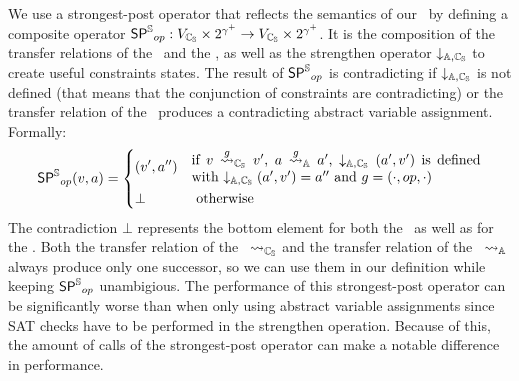 We use a strongest-post operator that reflects the semantics of our \symbolicExecutionCPA\ by 
defining a composite operator $\operatorname{\operatorname{\operatorname{\mathsf{SP}}}^{\mathbb{S}}}_{op} : V_{\mathbb{C_{S}}} \times 2^{\gamma^+} \rightarrow V_{\mathbb{C_{S}}} \times 2^{\gamma^+}$.
It is the composition of the transfer relations of the \symbolicValueAnalysisCPA\ and the \constraintsCPA, as well as the strengthen operator $\downarrow_{{\mathbb{A}}, {\mathbb{C_{S}}}}$ to create useful constraints states.
The result of $\operatorname{\operatorname{\operatorname{\mathsf{SP}}}^{\mathbb{S}}}_{op}$ is contradicting if $\downarrow_{{\mathbb{A}}, {\mathbb{C_{S}}}}$ is not defined (that means that the conjunction of constraints are contradicting) or the transfer relation of the \symbolicValueAnalysisCPA\ produces a contradicting abstract variable assignment.
Formally:
\[ \strongestPostOpSym_{op} (v, a) = \begin{dcases}
(v', a'') & \parbox{.6\textwidth}{ if $v \gtransfer_\symValCPA v'$,  $a \gtransfer_\constrCPA a'$, $\strengthenOp{\constrCPA}{\symValCPA}(a', v')$ is defined with $\strengthenOp{\constrCPA}{\symValCPA}(a', v') = a''$ and $g = (\cdot, op, \cdot)$}\\
\bot & \text{ otherwise}
\end{dcases}\]
The contradiction $\bot$ represents the bottom element for both the \symbolicValueAnalysisCPA\ as well as for the \constraintsCPA.
Both the transfer relation of the \symbolicValueAnalysisCPA\ $\rightsquigarrow_{\mathbb{C_{S}}}$ and the transfer relation of the \constraintsCPA\ $\rightsquigarrow_{\mathbb{A}}$ always produce only one successor, so we can use them in our definition while keeping $\operatorname{\operatorname{\operatorname{\mathsf{SP}}}^{\mathbb{S}}}_{op}$ unambigious.
The performance of this strongest-post operator can be significantly worse than when only using abstract variable assignments since SAT checks have to be performed in the strengthen operation.
Because of this, the amount of calls of the strongest-post operator can make a notable difference in performance.

